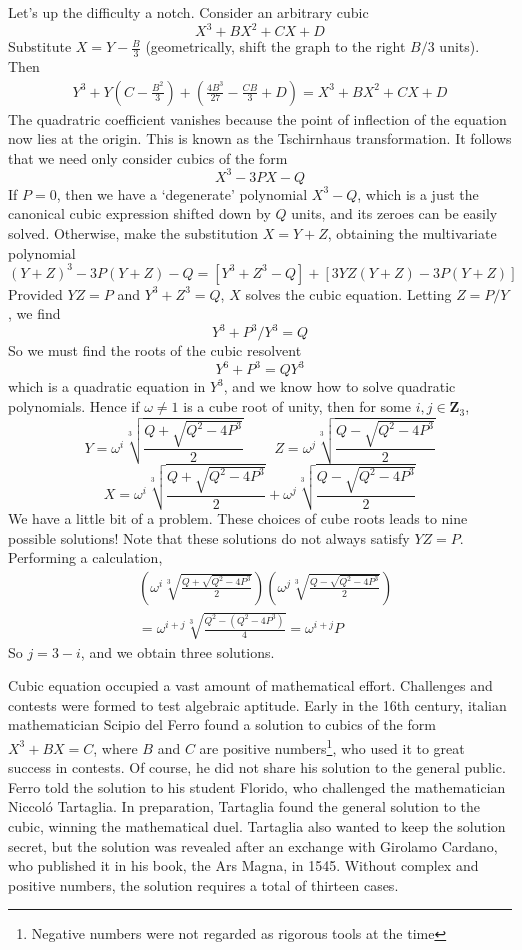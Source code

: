 Let's up the difficulty a notch. Consider an arbitrary cubic
%
\[ X^3 + BX^2 + CX + D \]
%
Substitute $X = Y - \frac{B}{3}$ (geometrically, shift the graph to the right $B/3$ units). Then
%
\begin{align*}
   Y^3 + Y\left(C - \frac{B^2}{3}\right) + \left( \frac{4B^3}{27} - \frac{CB}{3} + D \right) = X^3 + BX^2 + CX + D
\end{align*}
%
The quadratric coefficient vanishes because the point of inflection of the equation now lies at the origin. This is known as the Tschirnhaus transformation. It follows that we need only consider cubics of the form
%
\[ X^3 - 3PX - Q \]
%
If $P = 0$, then we have a `degenerate' polynomial $X^3 - Q$, which is a just the canonical cubic expression shifted down by $Q$ units, and its zeroes can be easily solved. Otherwise, make the substitution $X = Y + Z$, obtaining the multivariate polynomial
%
\[ (Y + Z)^3 - 3P(Y + Z) - Q = [Y^3 + Z^3 - Q] + [3YZ(Y + Z) - 3P(Y + Z)] \]
%
Provided $YZ = P$ and $Y^3 + Z^3 = Q$, $X$ solves the cubic equation. Letting $Z = P/Y$, we find
%
\[ Y^3 + P^3/Y^3 = Q \]
%
So we must find the roots of the cubic resolvent
%
\[ Y^6 + P^3 = QY^3 \]
%
which is a quadratic equation in $Y^3$, and we know how to solve quadratic polynomials. Hence if $\omega \neq 1$ is a cube root of unity, then for some $i,j \in \mathbf{Z}_3$,
%
\[ Y = \omega^i \sqrt[3]{\frac{Q + \sqrt{Q^2 - 4P^3}}{2}}\ \ \ \ \ \ \ \ \ \  Z = \omega^j \sqrt[3]{\frac{Q - \sqrt{Q^2 - 4P^3}}{2}} \]
%
\[ X = \omega^i \sqrt[3]{\frac{Q + \sqrt{Q^2 - 4P^3}}{2}} + \omega^j \sqrt[3]{\frac{Q - \sqrt{Q^2 - 4P^3}}{2}} \]
%
We have a little bit of a problem. These choices of cube roots leads to nine possible solutions! Note that these solutions do not always satisfy $YZ = P$. Performing a calculation,
%
\begin{align*}
    &\left( \omega^i \sqrt[3]{\frac{Q + \sqrt{Q^2 - 4P^3}}{2}} \right) \left( \omega^j \sqrt[3]{\frac{Q - \sqrt{Q^2 - 4P^3}}{2}} \right)\\
    &= \omega^{i + j} \sqrt[3]{\frac{Q^2-(Q^2 - 4P^3)}{4}} = \omega^{i + j} P
\end{align*}
%
So $j = 3-i$, and we obtain three solutions.

Cubic equation occupied a vast amount of mathematical effort. Challenges and contests were formed to test algebraic aptitude. Early in the 16th century, italian mathematician Scipio del Ferro found a solution to cubics of the form $X^3 + BX = C$, where $B$ and $C$ are positive numbers\footnote{Negative numbers were not regarded as rigorous tools at the time}, who used it to great success in contests. Of course, he did not share his solution to the general public. Ferro told the solution to his student Florido, who challenged the mathematician Niccol\'{o} Tartaglia. In preparation, Tartaglia found the general solution to the cubic, winning the mathematical duel. Tartaglia also wanted to keep the solution secret, but the solution was revealed after an exchange with Girolamo Cardano, who published it in his book, the Ars Magna, in 1545. Without complex and positive numbers, the solution requires a total of thirteen cases.

